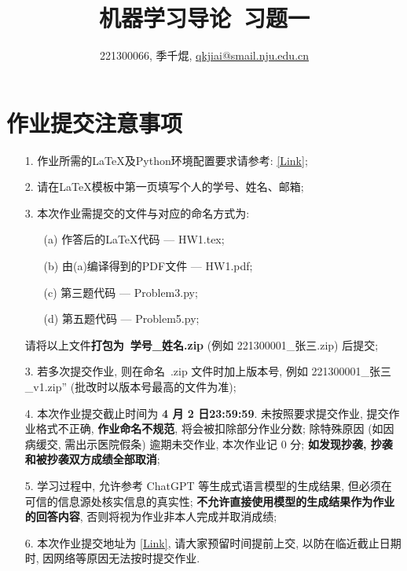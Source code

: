 \documentclass[a4paper,UTF8]{article}
\numberwithin{equation}{section}
\theoremstyle{definition}
\begin{document}
\title{机器学习导论\ 习题一}
\author{221300066, 季千焜, \href{mailto:邮箱}{qkjiai@smail.nju.edu.cn}}
\maketitle
\section*{作业提交注意事项}
\begin{tcolorbox}
    \begin{enumerate}
        \item[1.] 作业所需的LaTeX及Python环境配置要求请参考: \href{https://www.lamda.nju.edu.cn/ML2024Spring/supplemantary/environment.pdf}{[Link]};
        \item[2.] 请在LaTeX模板中第一页填写个人的学号、姓名、邮箱;
        \item[3.] 本次作业需提交的文件与对应的命名方式为:
            \begin{enumerate}
                \item [(a)] 作答后的LaTeX代码 --- HW1.tex;
                \item [(b)] 由(a)编译得到的PDF文件 --- HW1.pdf;
                \item [(c)] 第三题代码 --- Problem3.py;
                \item [(d)] 第五题代码 --- Problem5.py;
            \end{enumerate}
            请将以上文件{\color{red}\textbf{打包为~学号\_姓名.zip}} (例如 221300001\_张三.zip) 后提交;
        \item[3.] 若多次提交作业, 则在命名~.zip 文件时加上版本号, 例如 221300001\_张三\_v1.zip” (批改时以版本号最高的文件为准);
        \item[4.] 本次作业提交截止时间为 {\color{red}\textbf{ 4 月 2 日23:59:59}}. 未按照要求提交作业, 提交作业格式不正确, {\color{red}\textbf{作业命名不规范}}, 将会被扣除部分作业分数; 除特殊原因 (如因病缓交, 需出示医院假条) 逾期未交作业, 本次作业记 0 分; {\color{red}\textbf{如发现抄袭, 抄袭和被抄袭双方成绩全部取消}};
        \item[5.] 学习过程中, 允许参考 ChatGPT 等生成式语言模型的生成结果, 但必须在可信的信息源处核实信息的真实性; {\color{red}\textbf{不允许直接使用模型的生成结果作为作业的回答内容}}, 否则将视为作业非本人完成并取消成绩;
        \item[6.] 本次作业提交地址为 \href{https://box.nju.edu.cn/u/d/d6a0c7575dc34a7d8e62/}{[Link]}, 请大家预留时间提前上交, 以防在临近截止日期时, 因网络等原因无法按时提交作业.
    \end{enumerate}
\end{tcolorbox}
\newpage
\end{document}
